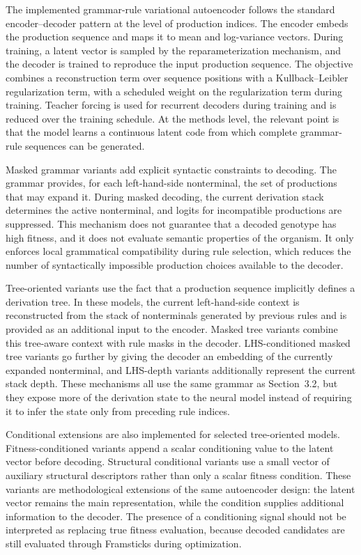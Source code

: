 The implemented grammar-rule variational autoencoder follows the standard encoder--decoder pattern at the level of production indices. The encoder embeds the production sequence and maps it to mean and log-variance vectors. During training, a latent vector is sampled by the reparameterization mechanism, and the decoder is trained to reproduce the input production sequence. The objective combines a reconstruction term over sequence positions with a Kullback--Leibler regularization term, with a scheduled weight on the regularization term during training. Teacher forcing is used for recurrent decoders during training and is reduced over the training schedule. At the methods level, the relevant point is that the model learns a continuous latent code from which complete grammar-rule sequences can be generated.

Masked grammar variants add explicit syntactic constraints to decoding. The \fone{} grammar provides, for each left-hand-side nonterminal, the set of productions that may expand it. During masked decoding, the current derivation stack determines the active nonterminal, and logits for incompatible productions are suppressed. This mechanism does not guarantee that a decoded genotype has high fitness, and it does not evaluate semantic properties of the organism. It only enforces local grammatical compatibility during rule selection, which reduces the number of syntactically impossible production choices available to the decoder.

Tree-oriented variants use the fact that a production sequence implicitly defines a derivation tree. In these models, the current left-hand-side context is reconstructed from the stack of nonterminals generated by previous rules and is provided as an additional input to the encoder. Masked tree variants combine this tree-aware context with rule masks in the decoder. LHS-conditioned masked tree variants go further by giving the decoder an embedding of the currently expanded nonterminal, and LHS-depth variants additionally represent the current stack depth. These mechanisms all use the same grammar as Section~3.2, but they expose more of the derivation state to the neural model instead of requiring it to infer the state only from preceding rule indices.

Conditional extensions are also implemented for selected tree-oriented models. Fitness-conditioned variants append a scalar conditioning value to the latent vector before decoding. Structural conditional variants use a small vector of auxiliary structural descriptors rather than only a scalar fitness condition. These variants are methodological extensions of the same autoencoder design: the latent vector remains the main representation, while the condition supplies additional information to the decoder. The presence of a conditioning signal should not be interpreted as replacing true fitness evaluation, because decoded candidates are still evaluated through Framsticks during optimization.

